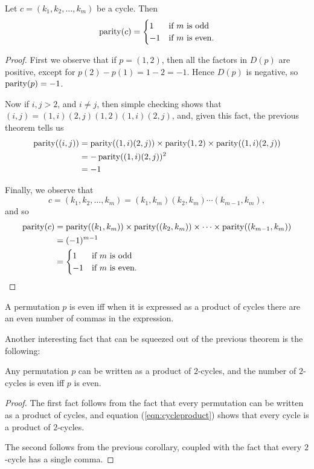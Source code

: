 \begin{theorem}
  Let $c = (k_{1}, k_{2}, \ldots, k_{m})$ be a cycle.  Then
  \[
    \operatorname{parity}(c) = \begin{cases}
      1 & \text{if $m$ is odd} \\
      -1 & \text{if $m$ is even}.
    \end{cases}
  \]
\end{theorem}
\begin{proof}
  First we observe that if $p = (1, 2)$, then all the factors in $D(p)$
  are positive, except for $p(2) - p(1) = 1 - 2 = -1$.  Hence $D(p)$ is
  negative, so $\operatorname{parity}(p) = -1$.
  
  Now if $i, j > 2$, and $i \ne j$, then simple checking shows that
  $(i,j) = (1,i)(2,j)(1,2)(1,i)(2,j)$,
  and, given this fact, the previous theorem tells us
  \begin{align*}
    \operatorname{parity}((i,j)) &= \operatorname{parity}((1,i)(2,j)) \times \operatorname{parity}(1,2) \times \operatorname{parity}((1,i)(2,j)) \\
    &= -\operatorname{parity}((1,i)(2,j))^{2}\\
    &= -1
  \end{align*}
  
  Finally, we observe that
  \begin{equation}\label{eqn:cycleproduct}
    c = (k_{1}, k_{2}, \ldots, k_{m}) = (k_{1}, k_{m})(k_{2}, k_{m})\cdots (k_{m-1}, k_{m}),
  \end{equation}
  and so
  \begin{align*}
    \operatorname{parity}(c) &= \operatorname{parity}((k_{1}, k_{m})) \times \operatorname{parity}((k_{2}, k_{m})) \times \cdots \times \operatorname{parity}((k_{m-1}, k_{m}))\\
    &= (-1)^{m-1} \\
    &= \begin{cases}
    1 & \text{if $m$ is odd} \\
    -1 & \text{if $m$ is even.}
    \end{cases}
  \end{align*}
\end{proof}

\begin{corollary}
  A permutation $p$ is even iff when it is expressed as a product of
  cycles there are an even number of commas in the expression.
\end{corollary}

Another interesting fact that can be squeezed out of the previous theorem
is the following:

\begin{proposition}
  Any permutation $p$ can be written as a product of $2$-cycles, and the
  number of $2$-cycles is even iff $p$ is even.
\end{proposition}
\begin{proof}
  The first fact follows from the fact that every permutation can be written
  as a product of cycles, and equation (\ref{eqn:cycleproduct}) shows that every cycle
  is a product of $2$-cycles.
  
  The second follows from the previous corollary, coupled with the fact that
  every $2$-cycle has a single comma.
\end{proof}

